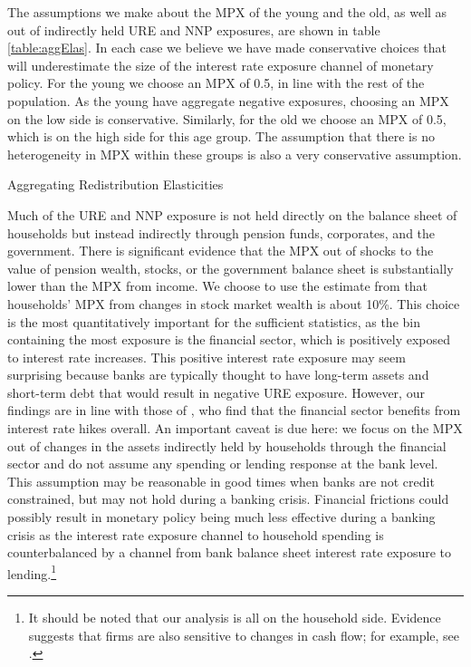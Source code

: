 \documentclass[titlepage]{\econtex}\newcommand{\texname}{ConsumptionHeterogeneity}
\begin{document}
	The assumptions we make about the MPX of the young and the old, as well as out of indirectly held URE and NNP exposures, are shown in table \ref{table:aggElas}. In each case we believe we have made conservative choices that will underestimate the size of the interest rate exposure channel of monetary policy. For the young we choose an MPX of 0.5, in line with the rest of the population. As the young have aggregate negative exposures, choosing an MPX on the low side is conservative. Similarly, for the old we choose an MPX of 0.5, which is on the high side for this age group. The assumption that there is no heterogeneity in MPX within these groups is also a very conservative assumption.
	\begin{center}
	\begin{table}
		\caption{Aggregating Redistribution Elasticities}
		\label{table:aggElas}
		
	\end{table}
	\end{center}
	Much of the URE and NNP exposure is not held directly on the balance sheet of households but instead indirectly through pension funds, corporates, and the government. There is significant evidence that the MPX out of shocks to the value of pension wealth, stocks, or the government balance sheet is substantially lower than the MPX from income. We choose to use the estimate from \cite{maggio_stock_2018} that households' MPX from changes in stock market wealth is about 10\%. This choice is the most quantitatively important for the sufficient statistics, as the bin containing the most exposure is the financial sector, which is positively exposed to interest rate increases. This positive interest rate exposure may seem surprising because banks are typically thought to have long-term assets and short-term debt that would result in negative URE exposure. However, our findings are in line with those of \cite{landier_banks_2013}, who find that the financial sector benefits from interest rate hikes overall. An important caveat is due here: we focus on the MPX out of changes in the assets indirectly held by households through the financial sector and do not assume any spending or lending response at the bank level. This assumption may be reasonable in good times when banks are not credit constrained, but may not hold during a banking crisis. Financial frictions could possibly result in monetary policy being much less effective during a banking crisis as the interest rate exposure channel to household spending is counterbalanced by a channel from bank balance sheet interest rate exposure to lending.\footnote{It should be noted that our analysis is all on the household side. Evidence suggests that firms are also sensitive to changes in cash flow; for example, see \cite{blanchard_what_1994}.} 
\end{document}
